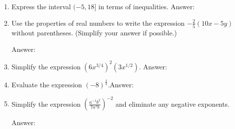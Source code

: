 \documentclass[11pt]{article}
\begin{document}
\begin{enumerate}
\item Express the interval $(-5,18]$ in terms of inequalities. \hfill Answer: \underline{\hspace{2in}}
\vspace{1in}

\item Use the properties of real numbers to write the expression $-\frac{2}{5}(10x-5y)$ without parentheses. (Simplify your answer if possible.)\\
\begin{flushright}{Answer: \underline{\hspace{2in}}}\end{flushright}

\vfill



\item Simplify the expression $ (6x^{3/4})^2(3x^{1/2}).$ \hfill Answer: \underline{\hspace{2in}}\\
\vspace{1in}

\item Evaluate the expression $(-8)^{\frac{2}{3}}.$\hfill Answer: \underline{\hspace{2in}}\\
\vspace{0.5in}





\item Simplify the expression $\left( \frac{a^{-1}b^2}{7a^3b}\right)^{-2}  $ and eliminate any negative exponents.\\
\begin{flushright}{Answer: \underline{\hspace{2in}}}\end{flushright}


\end{enumerate}
\end{document}
